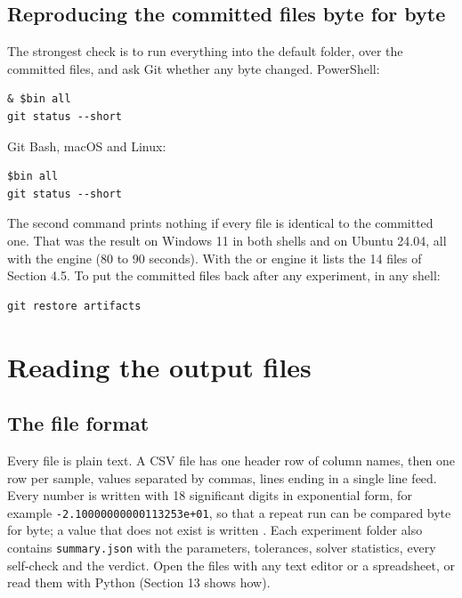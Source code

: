\documentclass[11pt]{article}
\begin{document}
\subsection{Reproducing the committed files byte for byte}

The strongest check is to run everything into the default folder, over the committed files, and ask Git whether any byte changed. PowerShell:

\begin{Verbatim}[fontsize=\small]
& $bin all
git status --short
\end{Verbatim}

Git Bash, macOS and Linux:

\begin{Verbatim}[fontsize=\small]
$bin all
git status --short
\end{Verbatim}

The second command prints nothing if every file is identical to the committed one. That was the result on Windows 11 in both shells and on Ubuntu 24.04, all with the \texttt{} engine (80 to 90 seconds). With the \texttt{} or \texttt{} engine it lists the 14 files of Section 4.5. To put the committed files back after any experiment, in any shell:

\begin{Verbatim}[fontsize=\small]
git restore artifacts
\end{Verbatim}

\section{Reading the output files}

\subsection{The file format}

Every file is plain text. A CSV file has one header row of column names, then one row per sample, values separated by commas, lines ending in a single line feed. Every number is written with 18 significant digits in exponential form, for example \texttt{-2.10000\allowbreak{}00000011\allowbreak{}3253e+01}, so that a repeat run can be compared byte for byte; a value that does not exist is written \texttt{}. Each experiment folder also contains \texttt{summary.\allowbreak{}json} with the parameters, tolerances, solver statistics, every self-check and the verdict. Open the files with any text editor or a spreadsheet, or read them with Python (Section 13 shows how).
\end{document}
